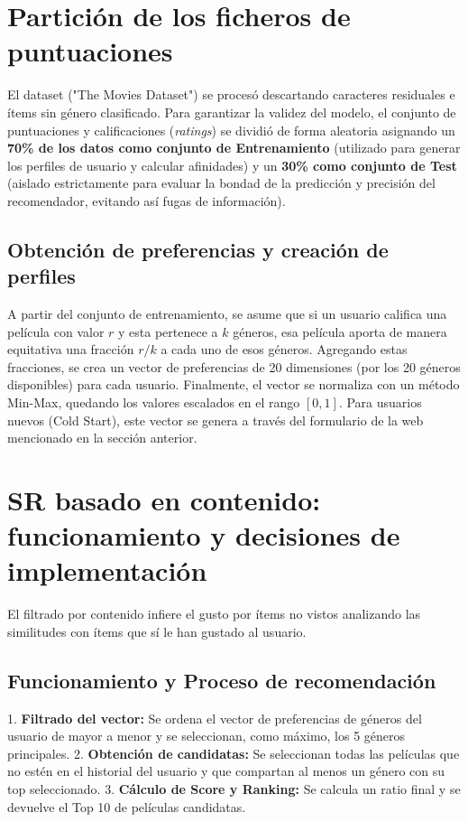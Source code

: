 \documentclass[12pt]{scrartcl}
\begin{document}
\section{Partición de los ficheros de puntuaciones}
El dataset ("The Movies Dataset") se procesó descartando caracteres residuales e ítems sin género clasificado.
Para garantizar la validez del modelo, el conjunto de puntuaciones y calificaciones (\textit{ratings}) se dividió de forma aleatoria asignando un \textbf{70\% de los datos como conjunto de Entrenamiento} (utilizado para generar los perfiles de usuario y calcular afinidades) y un \textbf{30\% como conjunto de Test} (aislado estrictamente para evaluar la bondad de la predicción y precisión del recomendador, evitando así fugas de información).

\subsection{Obtención de preferencias y creación de perfiles}
A partir del conjunto de entrenamiento, se asume que si un usuario califica una película con valor $r$ y esta pertenece a $k$ géneros, esa película aporta de manera equitativa una fracción $r/k$ a cada uno de esos géneros. Agregando estas fracciones, se crea un vector de preferencias de 20 dimensiones (por los 20 géneros disponibles) para cada usuario. Finalmente, el vector se normaliza con un método Min-Max, quedando los valores escalados en el rango $[0, 1]$. Para usuarios nuevos (Cold Start), este vector se genera a través del formulario de la web mencionado en la sección anterior.

\section{SR basado en contenido: funcionamiento y decisiones de implementación}
El filtrado por contenido infiere el gusto por ítems no vistos analizando las similitudes con ítems que sí le han gustado al usuario. 

\subsection{Funcionamiento y Proceso de recomendación}
1. \textbf{Filtrado del vector:} Se ordena el vector de preferencias de géneros del usuario de mayor a menor y se seleccionan, como máximo, los 5 géneros principales.
2. \textbf{Obtención de candidatas:} Se seleccionan todas las películas que no estén en el historial del usuario y que compartan al menos un género con su top seleccionado.
3. \textbf{Cálculo de Score y Ranking:} Se calcula un ratio final y se devuelve el Top 10 de películas candidatas.
\end{document}
